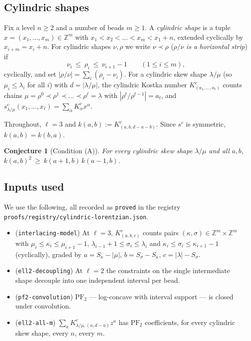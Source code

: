 \documentclass[11pt]{article}
\theoremstyle{plain}
\newtheorem{conjecture}[theorem]{Conjecture}
\theoremstyle{definition}
\newcommand{\Z}{\mathbb{Z}}
\newcommand{\PFtwo}{\mathrm{PF}_2}
\begin{document}
\subsection{Cylindric shapes}
Fix a level $n\ge 2$ and a number of beads $m\ge 1$. A \emph{cylindric shape} is a tuple
$x=(x_1,\dots,x_m)\in\Z^m$ with $x_1<x_2<\dots<x_m<x_1+n$, extended cyclically by
$x_{i+m}=x_i+n$. For cylindric shapes $\nu,\rho$ we write $\nu\prec\rho$
(\emph{$\rho/\nu$ is a horizontal strip}) if
\[
  \nu_i\ \le\ \rho_i\ \le\ \nu_{i+1}-1\qquad (1\le i\le m),
\]
cyclically, and set $|\rho/\nu|=\sum_i(\rho_i-\nu_i)$. For a cylindric skew shape
$\lambda/\mu$ (so $\mu_i\le\lambda_i$ for all $i$) with $d=|\lambda/\mu|$, the cylindric
Kostka number $K^c_{(a_1,\dots,a_\ell)}$ counts chains
$\mu=\rho^0\prec\rho^1\prec\dots\prec\rho^{\ell}=\lambda$ with $|\rho^t/\rho^{t-1}|=a_t$,
and $s^c_{\lambda/\mu}(x_1,\dots,x_\ell)=\sum_\alpha K^c_\alpha x^\alpha$.

Throughout, $\ell=3$ and $k(a,b):=K^c_{(a,b,d-a-b)}$. Since $s^c$ is symmetric,
$k(a,b)=k(b,a)$.

\begin{conjecture}[Condition (A)]\label{conj:A}
For every cylindric skew shape $\lambda/\mu$ and all $a,b$,
$k(a,b)^2\ \ge\ k(a+1,b)\,k(a-1,b)$.
\end{conjecture}

\subsection{Inputs used}
We use the following, all recorded as \texttt{proved} in the registry
\texttt{proofs/registry/cylindric-lorentzian.json}.

\begin{itemize}
\item[(P1)] (\texttt{interlacing-model}) At $\ell=3$, $K^c_{(a,b,c)}$ counts pairs
$(\kappa,\sigma)\in\Z^m\times\Z^m$ with $\mu_i\le\kappa_i\le\mu_{i+1}-1$,
$\lambda_{i-1}+1\le\sigma_i\le\lambda_i$ and $\kappa_i\le\sigma_i\le\kappa_{i+1}-1$
(cyclically), graded by $a=S_\kappa-|\mu|$, $b=S_\sigma-S_\kappa$, $c=|\lambda|-S_\sigma$.
\item[(P2)] (\texttt{ell2-decoupling}) At $\ell=2$ the constraints on the single
intermediate shape decouple into one independent interval per bead.
\item[(P3)] (\texttt{pf2-convolution}) $\PFtwo$ --- log-concave with interval support --- is
closed under convolution.
\item[(P4)] (\texttt{ell2-all-m}) $\sum_a K^c_{\lambda/\mu,(a,d-a)}z^a$ has $\PFtwo$
coefficients, for every cylindric skew shape, every $n$, every $m$.
\end{itemize}
\end{document}
